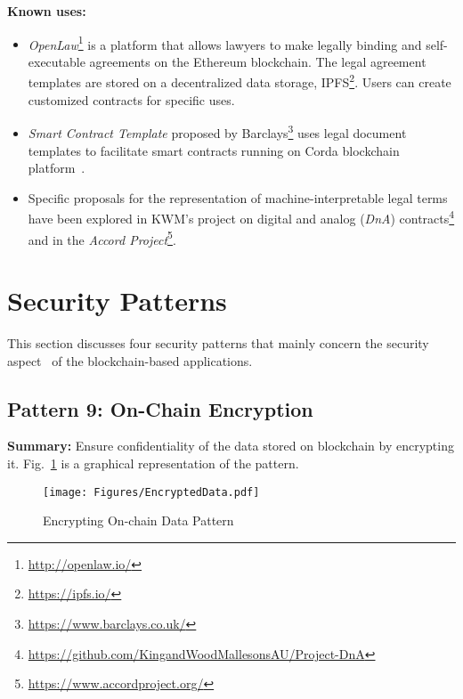 \vspace{0.5em}\noindent \textbf{Known uses:}
\begin{itemize}
  \item \textit{OpenLaw}\footnote{\url{http://openlaw.io/}} is a platform that allows lawyers to make legally binding and self-executable agreements on the Ethereum blockchain. The legal agreement templates are stored on a decentralized data storage, IPFS\footnote{\url{https://ipfs.io/}}. Users can create customized contracts for specific uses.
  \item \textit{Smart Contract Template} proposed by Barclays\footnote{\url{https://www.barclays.co.uk/}} uses legal document templates to facilitate smart contracts running on Corda blockchain platform~\cite{barrclays1,barrclays2}. 
  \item Specific proposals for the representation of machine-interpretable legal terms have been explored in KWM's project on digital and analog (\textit{DnA}) contracts\footnote{\url{https://github.com/KingandWoodMallesonsAU/Project-DnA}} and in the \textit{Accord Project}\footnote{\url{https://www.accordproject.org/}}.
\end{itemize}

\section{Security Patterns}
\label{sec:securitypatterns}

This section discusses four security patterns that mainly concern the security aspect~\cite{securitypatterns} of the blockchain-based applications. 


\subsection{ \textbf{Pattern 9: On-Chain Encryption}}
\label{sec:encrypted}

\noindent \textbf{Summary:} Ensure confidentiality of the data stored on blockchain by encrypting it. Fig.~\ref{fig:encrypteddata} is a graphical representation of the pattern.

\begin{figure}[t]
\begin{center}
\texttt{[image: Figures/EncryptedData.pdf]}
\caption{Encrypting On-chain Data Pattern}\label{fig:encrypteddata}
\end{center}
\end{figure}

